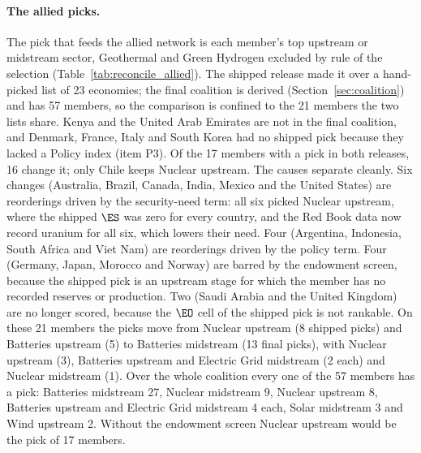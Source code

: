 \paragraph{The allied picks.} The pick that feeds the allied network is each member's top
upstream or midstream sector, Geothermal and Green Hydrogen excluded by rule of the selection
(Table~\ref{tab:reconcile_allied}). The shipped release made it over a hand-picked list of 23
economies; the final coalition is derived (Section~\ref{sec:coalition}) and has 57 members, so
the comparison is confined to the 21 members the two lists share. Kenya and the United Arab
Emirates are not in the final coalition, and Denmark, France, Italy and South Korea had no
shipped pick because they lacked a Policy index (item P3). Of the 17 members with a pick in both
releases, 16 change it; only Chile keeps Nuclear upstream. The causes separate cleanly. Six
changes (Australia, Brazil, Canada, India, Mexico and the United States) are reorderings driven
by the security-need term: all six picked Nuclear upstream, where the shipped $\ES$ was zero for
every country, and the Red Book data now record uranium for all six, which lowers their need.
Four (Argentina, Indonesia, South Africa and Viet Nam) are reorderings driven by the policy term.
Four (Germany, Japan, Morocco and Norway) are barred by the endowment screen, because the shipped
pick is an upstream stage for which the member has no recorded reserves or production. Two (Saudi
Arabia and the United Kingdom) are no longer scored, because the $\EO$ cell of the shipped pick
is not rankable. On these 21 members the picks move from Nuclear upstream (8 shipped picks) and
Batteries upstream (5) to Batteries midstream (13 final picks), with Nuclear upstream (3),
Batteries upstream and Electric Grid midstream (2 each) and Nuclear midstream (1). Over the whole
coalition every one of the 57 members has a pick: Batteries midstream 27, Nuclear midstream 9,
Nuclear upstream 8, Batteries upstream and Electric Grid midstream 4 each, Solar midstream 3 and
Wind upstream 2. Without the endowment screen Nuclear upstream would be the pick of 17 members.



